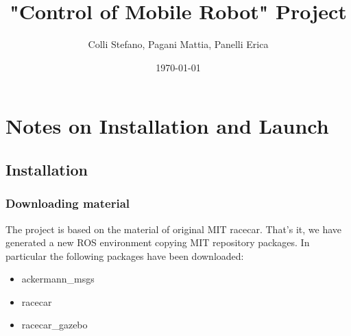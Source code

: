 \documentclass[12pt, letterpaper]{report}
\title{"Control of Mobile Robot" Project}
\author{Colli Stefano, Pagani Mattia, Panelli Erica}
\date{\today}
\begin{document}
	


\begin{abstract}
\end{abstract}

\tableofcontents

\newpage

%

\chapter{Notes on Installation and Launch}

\section{Installation}

\subsection{Downloading material}

The project is based on the material of original MIT racecar. That's it, we have generated a new ROS environment copying MIT repository packages. In particular the following packages have been downloaded:

\begin{itemize}
	\item ackermann\_msgs
	\item racecar
	\item racecar\_gazebo
\end{itemize} 
\end{document}
